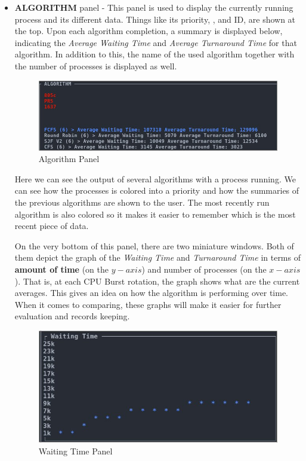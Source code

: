 \documentclass{article}
\newcommand{\code}[1]{\codeinline{\texttt{#1}}}
\begin{document}
\begin{itemize}
\item \textbf{ALGORITHM} panel - This panel is used to display the currently running process and its different data. Things like its priority, \code{ttl}, and ID, are shown at the top. Upon each algorithm completion, a summary is displayed below, indicating the \textit{Average Waiting Time} and \textit{Average Turnaround Time} for that algorithm. In addition to this, the name of the used algorithm together with the number of processes is displayed as well.

  \begin{figure}[H]
    \includegraphics[width=\linewidth]{./pics/alg.jpg}
    \caption{Algorithm Panel}
    \label{fig:Algorithm Panel}
  \end{figure}

  Here we can see the output of several algorithms with a process running. We can see how the processes is colored into a priority and how the summaries of the previous algorithms are shown to the user. The most recently run algorithm is also colored so it makes it easier to remember which is the most recent piece of data.

  On the very bottom of this panel, there are two miniature windows. Both of them depict the graph of the \textit{Waiting Time} and \textit{Turnaround Time} in terms of \textbf{amount of time} (on the $y-axis$) and number of processes (on the $x-axis$). That is, at each CPU Burst rotation, the graph shows what are the current averages. This gives an idea on how the algorithm is performing over time. When it comes to comparing, these graphs will make it easier for further evaluation and records keeping.

  \begin{figure}[H]
    \includegraphics[width=\linewidth]{./pics/awt.jpg}
    \caption{Waiting Time Panel}
    \label{fig:Waiting Time Panel}
  \end{figure}


\end{itemize}
\end{document}
